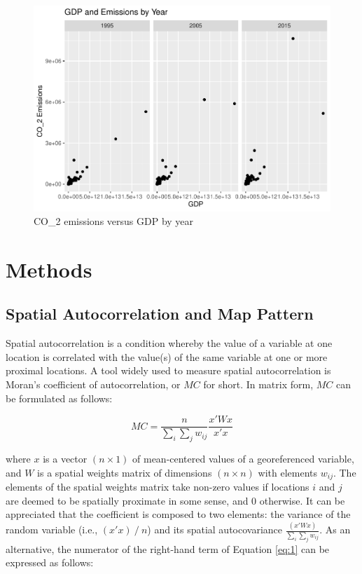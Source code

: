 \documentclass[]{elsarticle} %
\makeatletter
\def\maxwidth{\ifdim\Gin@nat@width>\linewidth\linewidth
\else\Gin@nat@width\fi}
\let\Oldincludegraphics\includegraphics
\renewcommand{\includegraphics}[1]{\Oldincludegraphics[width=\maxwidth]{#1}}
\makeatother
\begin{document}
\begin{figure}
\centering
\includegraphics{Elsevier-Template_files/figure-latex/fig-gdp-emissions-by-year-1.pdf}
\caption{\label{fig:gdp-emissions-by-year} CO\_2 emissions versus GDP by
year}
\end{figure}

\hypertarget{methods}{%
\section{Methods}\label{methods}}

\hypertarget{spatial-autocorrelation-and-map-pattern}{%
\subsection{Spatial Autocorrelation and Map
Pattern}\label{spatial-autocorrelation-and-map-pattern}}

Spatial autocorrelation is a condition whereby the value of a variable
at one location is correlated with the value(s) of the same variable at
one or more proximal locations. A tool widely used to measure spatial
autocorrelation is Moran's coefficient of autocorrelation, or \(MC\) for
short. In matrix form, \(MC\) can be formulated as follows:

\begin{equation} 
\label{eq:1}
MC=\frac{n}{\sum_{i}{\sum_{j}{w_{ij}}}}\frac{x'Wx}{x'x}
\end{equation}

where \(x\) is a vector \((n\times1)\) of mean-centered values of a
georeferenced variable, and \(W\) is a spatial weights matrix of
dimensions \((n\times n)\) with elements \(w_{ij}\). The elements of the
spatial weights matrix take non-zero values if locations \(i\) and \(j\)
are deemed to be spatially proximate in some sense, and 0 otherwise. It
can be appreciated that the coefficient is composed to two elements: the
variance of the random variable (i.e., \((x' x)⁄n\)) and its spatial
autocovariance \(\frac{(x'Wx)}{\sum_{i}{\sum_{j}{w_{ij}}}}\). As an
alternative, the numerator of the right-hand term of Equation \ref{eq:1}
can be expressed as follows:
\end{document}
